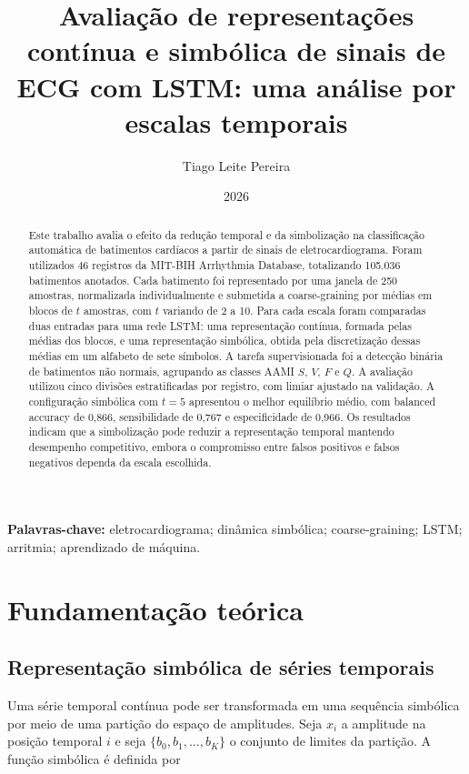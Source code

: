 \documentclass[12pt,a4paper]{article}
\title{Avaliação de representações contínua e simbólica de sinais de ECG com LSTM: uma análise por escalas temporais}
\author{Tiago Leite Pereira}
\date{2026}
\begin{document}
\maketitle

\begin{abstract}
Este trabalho avalia o efeito da redução temporal e da simbolização na classificação automática de batimentos cardíacos a partir de sinais de eletrocardiograma. Foram utilizados 46 registros da MIT-BIH Arrhythmia Database, totalizando 105.036 batimentos anotados. Cada batimento foi representado por uma janela de 250 amostras, normalizada individualmente e submetida a coarse-graining por médias em blocos de $t$ amostras, com $t$ variando de 2 a 10. Para cada escala foram comparadas duas entradas para uma rede LSTM: uma representação contínua, formada pelas médias dos blocos, e uma representação simbólica, obtida pela discretização dessas médias em um alfabeto de sete símbolos. A tarefa supervisionada foi a detecção binária de batimentos não normais, agrupando as classes AAMI $S$, $V$, $F$ e $Q$. A avaliação utilizou cinco divisões estratificadas por registro, com limiar ajustado na validação. A configuração simbólica com $t=5$ apresentou o melhor equilíbrio médio, com balanced accuracy de 0,866, sensibilidade de 0,767 e especificidade de 0,966. Os resultados indicam que a simbolização pode reduzir a representação temporal mantendo desempenho competitivo, embora o compromisso entre falsos positivos e falsos negativos dependa da escala escolhida.
\end{abstract}

\noindent\textbf{Palavras-chave:} eletrocardiograma; dinâmica simbólica; coarse-graining; LSTM; arritmia; aprendizado de máquina.

\section{Fundamentação teórica}

\subsection{Representação simbólica de séries temporais}

Uma série temporal contínua pode ser transformada em uma sequência simbólica por meio de uma partição do espaço de amplitudes. Seja $x_i$ a amplitude na posição temporal $i$ e seja $\{b_0,b_1,\ldots,b_K\}$ o conjunto de limites da partição. A função simbólica é definida por
\end{document}
